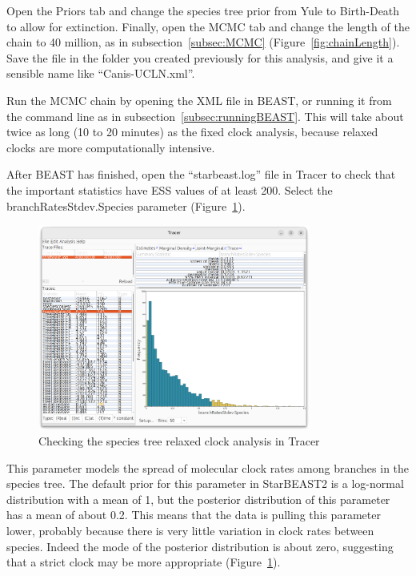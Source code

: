 \documentclass[12pt]{article}
\begin{document}
Open the Priors tab and change the species tree prior from Yule to Birth-Death
to allow for extinction. Finally, open the MCMC tab and change the length of
the chain to 40 million, as in subsection~\ref{subsec:MCMC}
(Figure~\ref{fig:chainLength}). Save the file in the folder you created
previously for this analysis, and give it a sensible name like ``Canis-UCLN.xml''.

Run the MCMC chain by opening the XML file in BEAST, or running it from
the command line as in subsection~\ref{subsec:runningBEAST}. This will
take about twice as long (10 to 20 minutes) as the fixed clock analysis,
because relaxed clocks are more computationally intensive.

After BEAST has finished, open the ``starbeast.log'' file in Tracer to
check that the important statistics have ESS values of at least 200.
Select the branchRatesStdev.Species parameter (Figure~\ref{fig:tracerUCLN}).

\begin{figure}[htb!]
\centering
\includegraphics[width=0.8\textwidth]{figures/tracerUCLN.png}
\caption
{Checking the species tree relaxed clock analysis in Tracer}
\label{fig:tracerUCLN}
\end{figure}

This parameter models the spread of molecular clock rates among branches in
the species tree. The default prior for this parameter in StarBEAST2 is a
log-normal distribution with a mean of 1, but the posterior distribution of this
parameter has a mean of about 0.2. This means that the data is pulling this
parameter lower, probably because there is very little variation in clock
rates between species. Indeed the mode of the posterior distribution is about
zero, suggesting that a strict clock may be more appropriate
(Figure~\ref{fig:tracerUCLN}).{}
\end{document}
